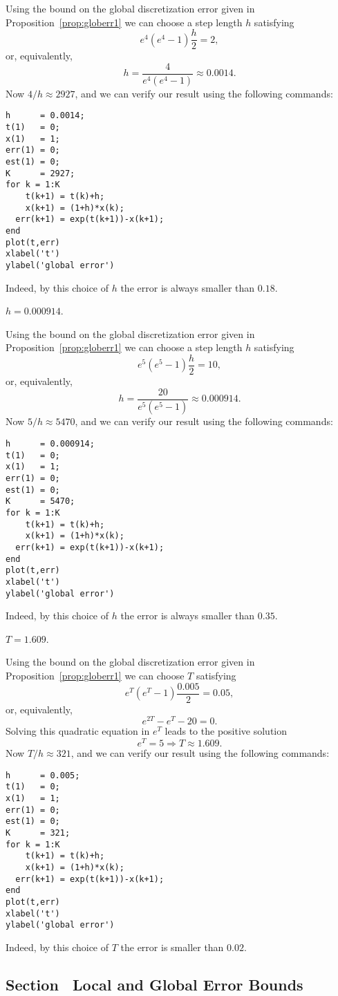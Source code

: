 \documentclass{ximera}
\begin{document}
\soln Using the bound on the global discretization error
given in Proposition~\ref{prop:globerr1} we can choose a
step length $h$ satisfying
\[
e^4(e^4-1)\frac{h}{2} = 2,
\]
or, equivalently,
\[
h = \frac{4}{e^4(e^4-1)} \approx 0.0014.
\]
Now $4/h \approx 2927$, and we can verify our result using the
following \Matlab commands:
\begin{verbatim}
h      = 0.0014;
t(1)   = 0;
x(1)   = 1;
err(1) = 0;
est(1) = 0;
K      = 2927;
for k = 1:K
    t(k+1) = t(k)+h;
    x(k+1) = (1+h)*x(k);
  err(k+1) = exp(t(k+1))-x(k+1);
end
plot(t,err)
xlabel('t')
ylabel('global error')
\end{verbatim}
Indeed, by this choice of $h$ the error is always smaller than $0.18$.


 \ans $h=0.000914$.

\soln Using the bound on the global discretization error
given in Proposition~\ref{prop:globerr1} we can choose a
step length $h$ satisfying
\[
e^{5}(e^{5}-1)\frac{h}{2} = 10,
\]
or, equivalently,
\[
h = \frac{20}{e^{5}(e^{5}-1)} \approx 0.000914.
\]
Now $5/h \approx 5470$, and we can verify our result using the
following \Matlab commands:
\begin{verbatim}
h      = 0.000914;
t(1)   = 0;
x(1)   = 1;
err(1) = 0;
est(1) = 0;
K      = 5470;
for k = 1:K
    t(k+1) = t(k)+h;
    x(k+1) = (1+h)*x(k);
  err(k+1) = exp(t(k+1))-x(k+1);
end
plot(t,err)
xlabel('t')
ylabel('global error')
\end{verbatim}
Indeed, by this choice of $h$ the error is always smaller than $0.35$.


 \ans $T=1.609$.

\soln Using the bound on the global discretization error
given in Proposition~\ref{prop:globerr1} we can choose
$T$ satisfying
\[
e^{T}(e^{T}-1)\frac{0.005}{2} = 0.05,
\]
or, equivalently,
\[
e^{2T} - e^T - 20 = 0.
\]
Solving this quadratic equation in $e^T$ leads to the positive
solution
\[
e^T = 5 \Rightarrow T \approx 1.609.
\]
Now $T/h \approx 321$, and we can verify our result using the
following \Matlab commands:
\begin{verbatim}
h      = 0.005;
t(1)   = 0;
x(1)   = 1;
err(1) = 0;
est(1) = 0;
K      = 321;
for k = 1:K
    t(k+1) = t(k)+h;
    x(k+1) = (1+h)*x(k);
  err(k+1) = exp(t(k+1))-x(k+1);
end
plot(t,err)
xlabel('t')
ylabel('global error')
\end{verbatim}
Indeed, by this choice of $T$ the error is smaller than $0.02$.


\subsection*{Section~\protect{\ref{sec:LGEE}} Local and Global Error Bounds}
\end{document}
